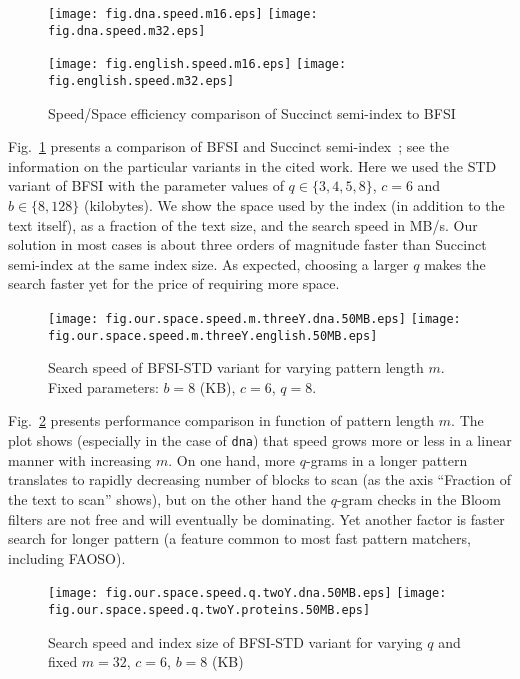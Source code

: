 \documentclass{llncs}
\begin{document}
\begin{figure}[pt]
\centerline{
\texttt{[image: fig.dna.speed.m16.eps]}
\texttt{[image: fig.dna.speed.m32.eps]}
}
\centerline{
\texttt{[image: fig.english.speed.m16.eps]}
\texttt{[image: fig.english.speed.m32.eps]}
}
\caption[Results]
{Speed/Space efficiency comparison of Succinct semi-index to BFSI}
\label{fig:speed_space_perf}
\end{figure}

Fig.~\ref{fig:speed_space_perf} presents a comparison of BFSI 
and Succinct semi-index~\cite[Sect.~2.2 and Sect.~3.1]{CNPSTjda10}; 
see the information on the particular variants in the cited work. 
Here we used the STD variant of BFSI with the parameter values of 
$q \in \{3,4,5,8\}$, $c = 6$ and $b \in \{8, 128\}$ (kilobytes). 
We show the space used by the index (in addition to the text itself), 
as a fraction of the text size, and the search speed in MB/s.
Our solution 
in most cases is about three orders of magnitude faster 
than Succinct semi-index at
the same index size. 
As expected, choosing a larger $q$ makes the search faster yet for the 
price of requiring more space.



\begin{figure}[pt]
\centerline{
\texttt{[image: fig.our.space.speed.m.threeY.dna.50MB.eps]}
\texttt{[image: fig.our.space.speed.m.threeY.english.50MB.eps]}
}
\caption[Results]
{Search speed of BFSI-STD variant for varying pattern length $m$. Fixed parameters: $b=8$ (KB), $c=6$, $q=8$.}
\label{fig:speed_space_m_threeY}
\end{figure}


Fig.~\ref{fig:speed_space_m_threeY} presents performance comparison 
in function of pattern length $m$. 
The plot shows (especially in the case of \texttt{dna}) that speed 
grows more or less in a linear manner with increasing $m$.
On one hand, more $q$-grams in a longer pattern translates to rapidly 
decreasing number of blocks to scan (as the axis ``Fraction of the text 
to scan'' shows), but on the other hand the $q$-gram checks in the Bloom filters 
are not free and will eventually be dominating.
Yet another factor 
is faster 
search for longer 
pattern (a feature common to most fast pattern matchers, including FAOSO).


\begin{figure}[pt]
\centerline{
\texttt{[image: fig.our.space.speed.q.twoY.dna.50MB.eps]}
\texttt{[image: fig.our.space.speed.q.twoY.proteins.50MB.eps]}
}
\caption[Results]
{Search speed and index size of BFSI-STD variant for varying $q$ and fixed 
$m=32$, $c=6$, $b=8$ (KB)}
\label{fig:speed_space_q_twoY}
\end{figure}
\end{document}
